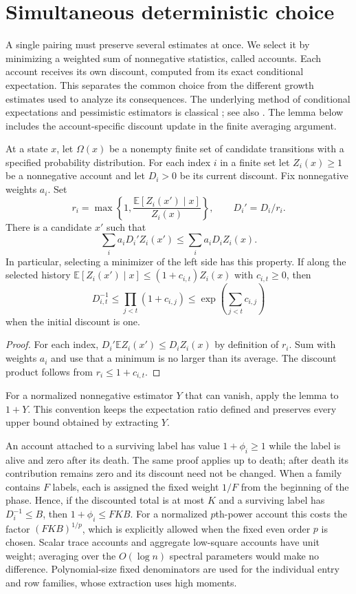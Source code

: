 \section{Simultaneous deterministic choice}\label{sec:accounts}

A single pairing must preserve several estimates at once. We select it
by minimizing a weighted sum of nonnegative statistics, called accounts.
Each account receives its own discount, computed from its exact
conditional expectation. This separates the common choice from the
different growth estimates used to analyze its consequences.
The underlying method of conditional expectations and pessimistic
estimators is classical \cite{Raghavan1988}; see also
\cite[Section~3]{WX2008}. The lemma below
includes the account-specific discount update in the finite averaging
argument.

\begin{lemma}\label{lem:discounted-accounts}
At a state $x$, let $\Omega(x)$ be a nonempty finite set of candidate
transitions with a specified probability distribution.  For each index
$i$ in a finite set let $Z_i(x)\ge1$ be a nonnegative account and let $D_i>0$ be its current
discount.  Fix nonnegative weights $a_i$.  Set
\[
 r_i=\max\left\{1,\frac{\mathbb E[Z_i(x')\mid x]}{Z_i(x)}\right\},
 \qquad D_i'=D_i/r_i.
\]
There is a candidate $x'$ such that
\[
 \sum_i a_iD_i'Z_i(x')\le\sum_i a_iD_iZ_i(x).
\]
In particular, selecting a minimizer of the left side has this property.
If along the selected history
$\mathbb E[Z_i(x')\mid x]\le(1+c_{i,t})Z_i(x)$ with
$c_{i,t}\ge0$, then
\[
 D_{i,t}^{-1}\le\prod_{j<t}(1+c_{i,j})
 \le\exp\left(\sum_{j<t}c_{i,j}\right)
\]
when the initial discount is one.
\end{lemma}

\begin{proof}
For each index,
$D_i'\mathbb EZ_i(x')\le D_iZ_i(x)$ by definition of $r_i$.
Sum with weights $a_i$ and use that a minimum is no larger than its
average.  The discount product follows from $r_i\le1+c_{i,t}$.
\end{proof}

For a normalized nonnegative estimator $Y$ that can vanish, apply the
lemma to $1+Y$. This convention keeps the expectation ratio defined
and preserves every upper bound obtained by extracting $Y$.

An account attached to a surviving label has value $1+\phi_i\ge1$ while
the label is alive and zero after its death.  The same proof applies up
to death; after death its contribution remains zero and its discount
need not be changed.  When a family contains $F$ labels, each is assigned
the fixed weight $1/F$ from the beginning of the phase.  Hence, if the
discounted total is at most $K$ and a surviving label has
$D_i^{-1}\le B$, then $1+\phi_i\le FKB$.  For a normalized $p$th-power
account this costs the factor $(FKB)^{1/p}$, which is explicitly allowed
when the fixed even order $p$ is chosen.
Scalar trace accounts and aggregate low-square accounts have unit
weight; averaging over the $O(\log n)$ spectral parameters would make no
difference.  Polynomial-size fixed denominators are used for the
individual entry and row families, whose extraction uses high moments.

